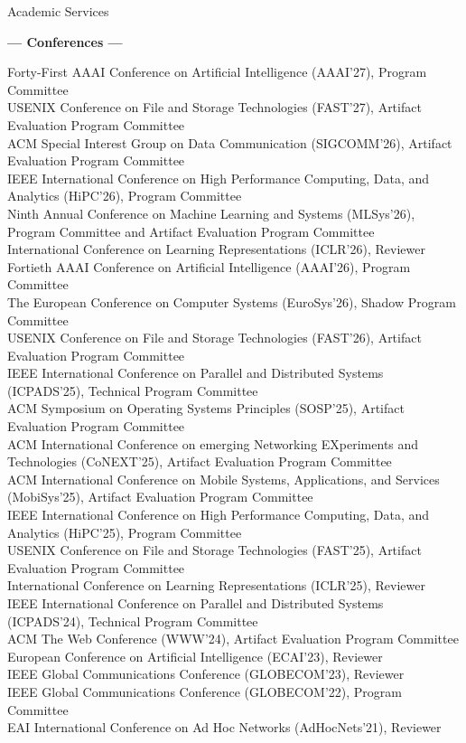 \documentclass{resume} %
\begin{document}
\begin{rSection}{Academic Services}

{\large \textbf{--- Conferences ---}}
\vspace{-0.5em}

{\small
Forty-First AAAI Conference on Artificial Intelligence (AAAI'27), Program Committee \\
USENIX Conference on File and Storage Technologies (FAST'27), Artifact Evaluation Program Committee \\
ACM Special Interest Group on Data Communication (SIGCOMM'26), Artifact Evaluation Program Committee \\
IEEE International Conference on High Performance Computing, Data, and Analytics (HiPC'26), Program Committee \\
Ninth Annual Conference on Machine Learning and Systems (MLSys'26), Program Committee and Artifact Evaluation Program Committee \\
International Conference on Learning Representations (ICLR'26), Reviewer \\
Fortieth AAAI Conference on Artificial Intelligence (AAAI'26), Program Committee \\
The European Conference on Computer Systems (EuroSys'26), Shadow Program Committee \\
USENIX Conference on File and Storage Technologies (FAST'26), Artifact Evaluation Program Committee \\
IEEE International Conference on Parallel and Distributed Systems (ICPADS'25), Technical Program Committee \\
ACM Symposium on Operating Systems Principles (SOSP'25), Artifact Evaluation Program Committee \\
ACM International Conference on emerging Networking EXperiments and Technologies (CoNEXT'25), Artifact Evaluation Program Committee \\
ACM International Conference on Mobile Systems, Applications, and Services (MobiSys'25), Artifact Evaluation Program Committee \\
IEEE International Conference on High Performance Computing, Data, and Analytics (HiPC'25), Program Committee \\
USENIX Conference on File and Storage Technologies (FAST'25), Artifact Evaluation Program Committee \\
International Conference on Learning Representations (ICLR'25), Reviewer \\
IEEE International Conference on Parallel and Distributed Systems (ICPADS'24), Technical Program Committee \\
ACM The Web Conference (WWW'24), Artifact Evaluation Program Committee \\
European Conference on Artificial Intelligence (ECAI'23), Reviewer \\
IEEE Global Communications Conference (GLOBECOM'23), Reviewer \\
IEEE Global Communications Conference (GLOBECOM'22), Program Committee \\
EAI International Conference on Ad Hoc Networks (AdHocNets'21), Reviewer

}
\end{rSection}
\end{document}
